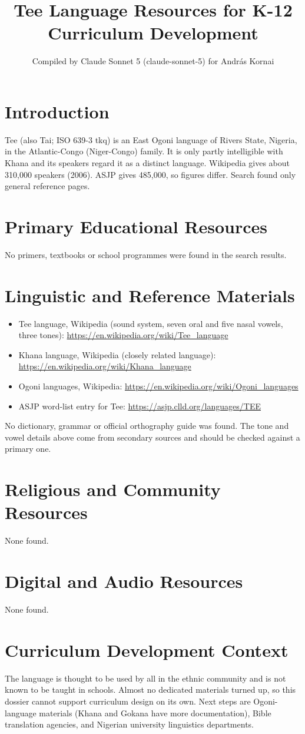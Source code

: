 \documentclass[12pt]{article}
\title{Tee Language Resources for K-12 Curriculum Development}
\author{Compiled by Claude Sonnet 5 (claude-sonnet-5) for Andr\'as Kornai}
\date{}
\begin{document}
\maketitle

\section{Introduction}
Tee (also Tai; ISO 639-3 tkq) is an East Ogoni language of Rivers State, Nigeria, in the Atlantic-Congo (Niger-Congo) family. It is only partly intelligible with Khana and its speakers regard it as a distinct language. Wikipedia gives about 310,000 speakers (2006). ASJP gives 485,000, so figures differ. Search found only general reference pages.

\section{Primary Educational Resources}
No primers, textbooks or school programmes were found in the search results.

\section{Linguistic and Reference Materials}
\begin{itemize}
\item Tee language, Wikipedia (sound system, seven oral and five nasal vowels, three tones): \url{https://en.wikipedia.org/wiki/Tee_language}
\item Khana language, Wikipedia (closely related language): \url{https://en.wikipedia.org/wiki/Khana_language}
\item Ogoni languages, Wikipedia: \url{https://en.wikipedia.org/wiki/Ogoni_languages}
\item ASJP word-list entry for Tee: \url{https://asjp.clld.org/languages/TEE}
\end{itemize}
No dictionary, grammar or official orthography guide was found. The tone and vowel details above come from secondary sources and should be checked against a primary one.

\section{Religious and Community Resources}
None found.

\section{Digital and Audio Resources}
None found.

\section{Curriculum Development Context}
The language is thought to be used by all in the ethnic community and is not known to be taught in schools. Almost no dedicated materials turned up, so this dossier cannot support curriculum design on its own. Next steps are Ogoni-language materials (Khana and Gokana have more documentation), Bible translation agencies, and Nigerian university linguistics departments.
\end{document}

